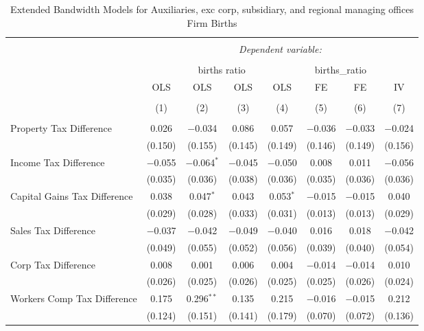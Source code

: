
\begin{table}[!htbp] \centering 
  \caption{Extended Bandwidth Models for  Auxiliaries, exc corp, subsidiary, and regional managing offices Firm Births} 
  \label{} 
\begin{tabular}{@{\extracolsep{5pt}}lccccccc} 
\\[-1.8ex]\hline 
\hline \\[-1.8ex] 
 & \multicolumn{7}{c}{\textit{Dependent variable:}} \\ 
\cline{2-8} 
\\[-1.8ex] & \multicolumn{4}{c}{births ratio} & \multicolumn{2}{c}{births\_ratio} &   \\ 
 & OLS & OLS & OLS & OLS & FE & FE & IV \\ 
\\[-1.8ex] & (1) & (2) & (3) & (4) & (5) & (6) & (7)\\ 
\hline \\[-1.8ex] 
 Property Tax Difference & 0.026 & $-$0.034 & 0.086 & 0.057 & $-$0.036 & $-$0.033 & $-$0.024 \\ 
  & (0.150) & (0.155) & (0.145) & (0.149) & (0.146) & (0.149) & (0.156) \\ 
  Income Tax Difference & $-$0.055 & $-$0.064$^{*}$ & $-$0.045 & $-$0.050 & 0.008 & 0.011 & $-$0.056 \\ 
  & (0.035) & (0.036) & (0.038) & (0.036) & (0.035) & (0.036) & (0.036) \\ 
  Capital Gains Tax Difference & 0.038 & 0.047$^{*}$ & 0.043 & 0.053$^{*}$ & $-$0.015 & $-$0.015 & 0.040 \\ 
  & (0.029) & (0.028) & (0.033) & (0.031) & (0.013) & (0.013) & (0.029) \\ 
  Sales Tax Difference & $-$0.037 & $-$0.042 & $-$0.049 & $-$0.040 & 0.016 & 0.018 & $-$0.042 \\ 
  & (0.049) & (0.055) & (0.052) & (0.056) & (0.039) & (0.040) & (0.054) \\ 
  Corp Tax Difference & 0.008 & 0.001 & 0.006 & 0.004 & $-$0.014 & $-$0.014 & 0.010 \\ 
  & (0.026) & (0.025) & (0.026) & (0.025) & (0.025) & (0.026) & (0.024) \\ 
  Workers Comp Tax Difference & 0.175 & 0.296$^{**}$ & 0.135 & 0.215 & $-$0.016 & $-$0.015 & 0.212 \\ 
  & (0.124) & (0.151) & (0.141) & (0.179) & (0.070) & (0.072) & (0.136) \\ 

\end{tabular}
\end{table}
